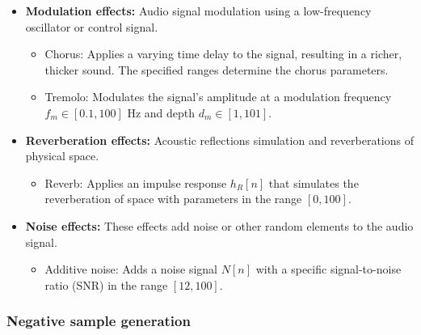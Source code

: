 \begin{itemize}
\item \textbf{Modulation effects:} Audio signal modulation using a low-frequency oscillator or control signal.
\begin{itemize}
    \item Chorus: Applies a varying time delay to the signal, resulting in a richer, thicker sound. The specified ranges determine the chorus parameters.
    \item Tremolo: Modulates the signal's amplitude at a modulation frequency $f_m \in [0.1, 100]$ Hz and depth $d_m \in [1, 101]$.
\end{itemize}

\item \textbf{Reverberation effects:} Acoustic reflections simulation and reverberations of physical space.
\begin{itemize}
    \item Reverb: Applies an impulse response $h_R[n]$ that simulates the reverberation of space with parameters in the range $[0, 100]$.
\end{itemize}

\item \textbf{Noise effects:} These effects add noise or other random elements to the audio signal.
\begin{itemize}
    \item Additive noise: Adds a noise signal $N[n]$ with a specific signal-to-noise ratio (SNR) in the range $[12, 100]$.
\end{itemize}
\end{itemize}

\subsubsection{Negative sample generation}

